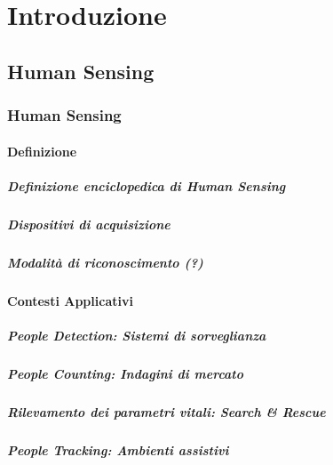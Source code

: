 

\chapter{Introduzione}
\label{chap:introduction}
    \section{Human Sensing}
    \label{sec:human_sensing}
        \subsection{Human Sensing}
            \subsubsection{Definizione}
                \paragraph{Definizione enciclopedica di Human Sensing}
                \paragraph{Dispositivi di acquisizione}
                \paragraph{Modalità di riconoscimento (?)}
            \subsubsection{Contesti Applicativi}
                \paragraph{People Detection: Sistemi di sorveglianza}
                \paragraph{People Counting: Indagini di mercato}
                \paragraph{Rilevamento dei parametri vitali: Search & Rescue}
                \paragraph{People Tracking: Ambienti assistivi}

